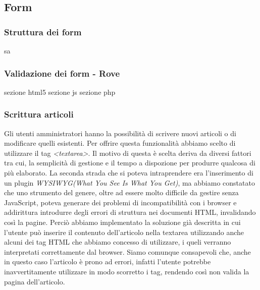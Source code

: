 \documentclass[12pt]{article}
\begin{document}
	\subsection{Form}
	\subsubsection{Struttura dei form}
	sa
	\subsubsection{Validazione dei form - Rove}
	sezione html5
	sezione js
	sezione php
	\subsubsection{Scrittura articoli}
	Gli utenti amministratori hanno la possibilità di scrivere nuovi articoli o di modificare quelli esistenti. Per offrire questa funzionalità abbiamo scelto di utilizzare il tag \emph{<textarea>}. Il motivo di questa è scelta deriva da diversi fattori tra cui, la semplicità di gestione e il tempo a dispozione per produrre qualcosa di più elaborato. La seconda strada che si poteva intraprendere era l'inserimento di un plugin \emph{WYSIWYG(What You See Is What You Get)}, ma abbiamo constatato che uno strumento del genere, oltre ad essere molto difficile da gestire senza JavaScript, poteva generare dei problemi di incompatibilità con i browser e addirittura introdurre degli errori di struttura nei documenti HTML, invalidando così la pagine. Perciò abbiamo implementato la soluzione già descritta in cui l'utente può inserire il contenuto dell'articolo nella textarea utilizzando anche alcuni dei tag HTML che abbiamo concesso di utilizzare, i queli verranno interpretati correttamente dal browser. Siamo comunque consapevoli che, anche in questo caso l'articolo è prono ad errori, infatti l'utente potrebbe inavvertitamente utilizzare in modo scorretto i tag, rendendo così non valida la pagina dell'articolo.
\end{document}
